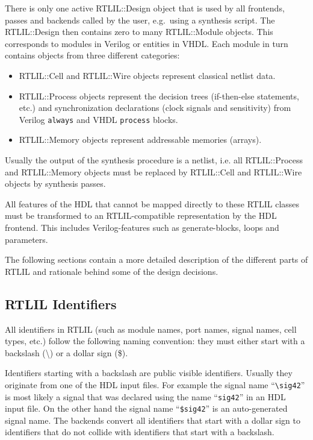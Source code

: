 There is only one active RTLIL::Design object that is used by all frontends,
passes and backends called by the user, e.g.~using a synthesis script. The RTLIL::Design then contains
zero to many RTLIL::Module objects. This corresponds to modules in Verilog or entities in VHDL. Each
module in turn contains objects from three different categories:

\begin{itemize}
\item RTLIL::Cell and RTLIL::Wire objects represent classical netlist data.
\item RTLIL::Process objects represent the decision trees (if-then-else statements, etc.) and synchronization
declarations (clock signals and sensitivity) from Verilog {\tt always} and VHDL {\tt process} blocks.
\item RTLIL::Memory objects represent addressable memories (arrays).
\end{itemize}

\begin{sloppypar}
Usually the output of the synthesis procedure is a netlist, i.e. all
RTLIL::Process and RTLIL::Memory objects must be replaced by RTLIL::Cell and
RTLIL::Wire objects by synthesis passes.
\end{sloppypar}

All features of the HDL that cannot be mapped directly to these RTLIL classes must be
transformed to an RTLIL-compatible representation by the HDL frontend. This includes
Verilog-features such as generate-blocks, loops and parameters.

The following sections contain a more detailed description of the different
parts of RTLIL and rationale behind some of the design decisions.

\subsection{RTLIL Identifiers}

All identifiers in RTLIL (such as module names, port names, signal names, cell
types, etc.) follow the following naming convention: they must either start with
a backslash (\textbackslash) or a dollar sign (\$).

Identifiers starting with a backslash are public visible identifiers. Usually
they originate from one of the HDL input files. For example the signal name ``{\tt \textbackslash sig42}''
is most likely a signal that was declared using the name ``{\tt sig42}'' in an HDL input file.
On the other hand the signal name ``{\tt \$sig42}'' is an auto-generated signal name. The backends
convert all identifiers that start with a dollar sign to identifiers that do not collide with
identifiers that start with a backslash.

